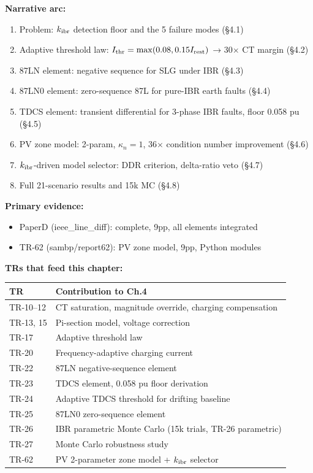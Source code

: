 \documentclass[11pt, a4paper]{article}
\begin{document}
\textbf{Narrative arc:}
\begin{enumerate}[nosep]
  \item Problem: $k_{\rm ibr}$ detection floor and the 5 failure modes (§4.1)
  \item Adaptive threshold law: $I_{\rm thr} = \max(0.08, 0.15 I_{\rm rest})$ → 30$\times$ CT margin (§4.2)
  \item 87LN element: negative sequence for SLG under IBR (§4.3)
  \item 87LN0 element: zero-sequence 87L for pure-IBR earth faults (§4.4)
  \item TDCS element: transient differential for 3-phase IBR faults, floor 0.058 pu (§4.5)
  \item PV zone model: 2-param, $\kappa_n=1$, 36$\times$ condition number improvement (§4.6)
  \item $k_{\rm ibr}$-driven model selector: DDR criterion, delta-ratio veto (§4.7)
  \item Full 21-scenario results and 15k MC (§4.8)
\end{enumerate}

\textbf{Primary evidence:}
\begin{itemize}[nosep]
  \item PaperD (ieee\_line\_diff): complete, 9pp, all elements integrated
  \item TR-62 (sambp/report62): PV zone model, 9pp, Python modules
\end{itemize}

\textbf{TRs that feed this chapter:}
\begin{center}
\begin{tabular}{ll}
\toprule
TR & Contribution to Ch.4 \\
\midrule
TR-10--12 & CT saturation, magnitude override, charging compensation \\
TR-13, 15 & Pi-section model, voltage correction \\
TR-17 & Adaptive threshold law \\
TR-20 & Frequency-adaptive charging current \\
TR-22 & 87LN negative-sequence element \\
TR-23 & TDCS element, 0.058 pu floor derivation \\
TR-24 & Adaptive TDCS threshold for drifting baseline \\
TR-25 & 87LN0 zero-sequence element \\
TR-26 & IBR parametric Monte Carlo (15k trials, TR-26 parametric) \\
TR-27 & Monte Carlo robustness study \\
TR-62 & PV 2-parameter zone model + $k_{\rm ibr}$ selector \\
\bottomrule
\end{tabular}
\end{center}
\end{document}
